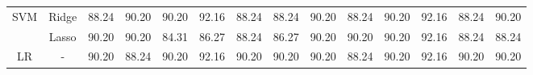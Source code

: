 \begin{landscape}
\begin{table}[]
{\begin{tabular}{cc|clllllclllll}
\multirow{2}{*}{SVM}            & Ridge                                 & 88.24                                                             & 90.20                                                                & 90.20                                                                & 92.16                                                               & 88.24                                                            & \multicolumn{1}{c|}{88.24}                                                                   & 90.20                                                             & 88.24                                                                & 90.20                                                                & 92.16                                                               & 88.24                                                            & 90.20                                                                   \\
                                & Lasso                                 & 90.20                                                             & 90.20                                                                & 84.31                                                                & 86.27                                                               & 88.24                                                            & \multicolumn{1}{c|}{86.27}                                                                   & 90.20                                                             & 90.20                                                                & 90.20                                                                & 92.16                                                               & 88.24                                                            & 88.24                                                                   \\ \hline
\multirow{3}{*}{LR}             & -                                     & 90.20                                                             & 88.24                                                                & 90.20                                                                & 92.16                                                               & 90.20                                                            & \multicolumn{1}{c|}{90.20}                                                                   & 90.20                                                             & 88.24                                                                & 90.20                                                                & 92.16                                                               & 90.20                                                            & 90.20                                                                   \\

\end{tabular}}
\end{table}
\end{landscape}
